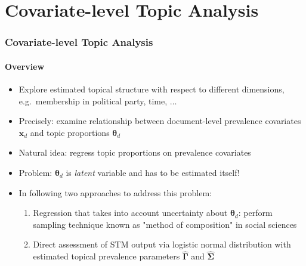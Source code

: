\documentclass[xcolor=dvipsnames]{beamer}
\begin{document}
\section{Covariate-level Topic Analysis}
\begin{frame}
\frametitle{Covariate-level Topic Analysis}
\framesubtitle{Overview}
\begin{itemize}
\item Explore estimated topical structure with respect to different dimensions, e.g.\ membership in political party, time, $\dots$
\item Precisely: examine relationship between document-level prevalence covariates $\boldsymbol{x}_d$ and topic proportions $\boldsymbol{\theta}_d$
\item Natural idea: regress topic proportions on prevalence covariates
\item Problem: $\boldsymbol{\theta}_d$ is \textit{latent} variable and has to be estimated itself!
\item In following two approaches to address this problem:
\begin{enumerate}
\item Regression that takes into account uncertainty about $\boldsymbol{\theta}_d$: perform sampling technique known as "method of composition" in social sciences
\item Direct assessment of STM output via logistic normal distribution with estimated topical prevalence parameters $\hat{\boldsymbol{\Gamma}}$ and $\hat{\boldsymbol{\Sigma}}$
\end{enumerate}
\end{itemize}
\end{frame}
\end{document}
